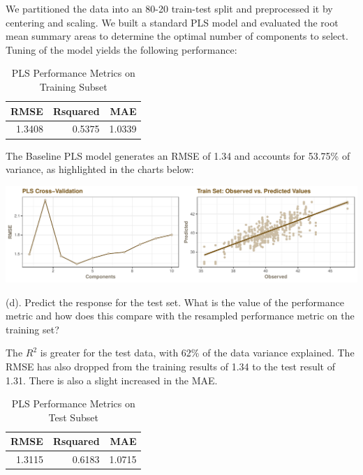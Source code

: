\documentclass[]{report}
\begin{document}
We partitioned the data into an 80-20 train-test split and preprocessed
it by centering and scaling. We built a standard PLS model and evaluated
the root mean summary areas to determine the optimal number of
components to select. Tuning of the model yields the following
performance:

\begin{table}[H]

\caption{\label{tab:kj-6.3c}PLS Performance Metrics on Training Subset}
\centering
\fontsize{8}{10}\selectfont
\begin{tabular}[t]{rrr}
\toprule
\textbf{RMSE} & \textbf{Rsquared} & \textbf{MAE}\\
\midrule
\rowcolor{gray!6}  1.3408 & 0.5375 & 1.0339\\
\bottomrule
\end{tabular}
\end{table}

The Baseline PLS model generates an RMSE of 1.34 and accounts for
53.75\% of variance, as highlighted in the charts below:

\includegraphics{AppliedPredictiveModeling_treebased_regression_files/figure-latex/kj-6.3c2-1.pdf}

\begin{subquestion}{(d).} Predict the response for the test set. What is the value of the performance metric and how does this compare with the resampled performance metric on the training set? 
\end{subquestion}

The \(R^2\) is greater for the test data, with 62\% of the data variance
explained. The RMSE has also dropped from the training results of 1.34
to the test result of 1.31. There is also a slight increased in the MAE.

\begin{table}[H]

\caption{\label{tab:kj-6.3d-1}PLS Performance Metrics on Test Subset}
\centering
\fontsize{8}{10}\selectfont
\begin{tabular}[t]{rrr}
\toprule
\textbf{RMSE} & \textbf{Rsquared} & \textbf{MAE}\\
\midrule
\rowcolor{gray!6}  1.3115 & 0.6183 & 1.0715\\
\bottomrule
\end{tabular}
\end{table}
\end{document}
